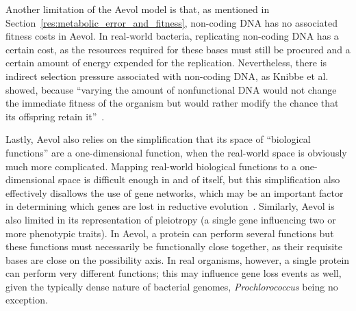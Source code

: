 Another limitation of the Aevol model is that, as mentioned in Section~\ref{res:metabolic_error_and_fitness}, non-coding DNA has no associated fitness costs in Aevol. In real-world bacteria, replicating non-coding DNA has a certain cost, as the resources required for these bases must still be procured and a certain amount of energy expended for the replication. Nevertheless, there is indirect selection pressure associated with non-coding DNA, as Knibbe et al. showed, because ``varying the amount of nonfunctional DNA would not change the immediate fitness of the organism but would rather modify the chance that its offspring retain it''~\cite{Knibbe2007}. 

Lastly, Aevol also relies on the simplification that its space of ``biological functions'' are a one-dimensional function, when the real-world space is obviously much more complicated. Mapping real-world biological functions to a one-dimensional space is difficult enough in and of itself, but this simplification also effectively disallows the use of gene networks, which may be an important factor in determining which genes are lost in reductive evolution~\cite{wilcox2003consequences}. Similarly, Aevol is also limited in its representation of pleiotropy (a single gene influencing two or more phenotypic traits). In Aevol, a protein can perform several functions but these functions must necessarily be functionally close together, as their requisite bases are close on the possibility axis. In real organisms, however, a single protein can perform very different functions; this may influence gene loss events as well, given the typically dense nature of bacterial genomes, \textit{Prochlorococcus} being no exception.